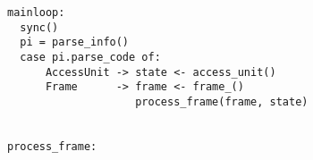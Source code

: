 
\begin{verbatim}
mainloop:
  sync()
  pi = parse_info()
  case pi.parse_code of:
      AccessUnit -> state <- access_unit()
      Frame      -> frame <- frame_()
                    process_frame(frame, state)


process_frame:
  
\end{verbatim}
